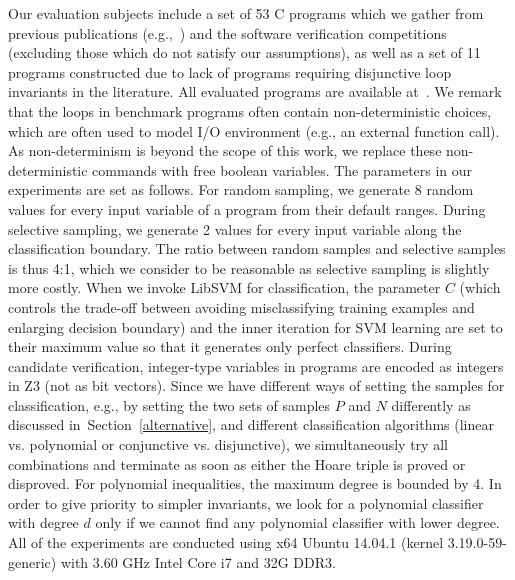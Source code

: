 Our evaluation subjects include a set of 53 C programs which we gather from previous publications (e.g.,~\cite{DBLP:conf/pldi/GulwaniSV08,sharma2012interpolants,gulavani2008automatically,jeannet2010interproc,isil2013inductive}) and the software verification competitions~\cite{Dirk:SVCOMP:2016} %
(excluding those which do not satisfy our assumptions), as well as a set of 11 programs constructed due to lack of programs requiring disjunctive loop invariants in the literature. All evaluated programs are available at~\cite{zilu:repo}. We remark that the loops in benchmark programs often contain non-deterministic choices, which are often used to model I/O environment (e.g., an external function call). As non-determinism is beyond the scope of this work, we replace these non-deterministic commands with free boolean variables. The parameters in our experiments are set as follows. For random sampling, we generate 8 random values for every input variable of a program from their default ranges. During selective sampling, we generate 2 values for every input variable along the classification boundary.
The ratio between random samples and selective samples is thus 4:1, which we consider to be reasonable as selective sampling is slightly more costly. When we invoke LibSVM for classification, the parameter $C$ (which controls the trade-off between avoiding misclassifying training examples and enlarging decision boundary) and the inner iteration for SVM learning are set to their maximum value so that it generates only perfect classifiers. During candidate verification, integer-type variables in programs are encoded as integers in Z3 (not as bit vectors). Since we have different ways of setting the samples for classification, e.g., by setting the two sets of samples $P$ and $N$ differently as discussed in~Section~\ref{alternative}, and different classification algorithms (linear vs. polynomial or conjunctive vs. disjunctive), we simultaneously try all combinations and terminate as soon as either the Hoare triple is proved or disproved. For polynomial inequalities, the maximum degree is bounded by 4. In order to give priority to simpler invariants, we look for a polynomial classifier with degree $d$ only if we cannot find any polynomial classifier with lower degree. All of the experiments are conducted using x64 Ubuntu 14.04.1 (kernel 3.19.0-59-generic) with 3.60 GHz Intel Core i7 and 32G DDR3.

